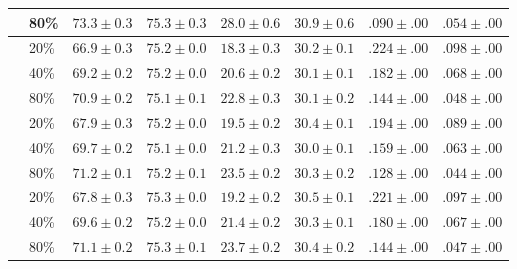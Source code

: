 \begin{table}[htpb]
\begin{longtable}{llrrrrrr}
                        & 80\% & $73.3\pm0.3$ & $75.3\pm0.3$ & $28.0\pm0.6$ & $30.9\pm0.6$ & $.090\pm.00$ & $.054\pm.00$ \\
\midrule
\multirow{3}{*}{\sla{}} & 20\% & $66.9\pm0.3$ & $75.2\pm0.0$ & $18.3\pm0.3$ & $30.2\pm0.1$ & $.224\pm.00$ & $.098\pm.00$ \\
                        & 40\% & $69.2\pm0.2$ & $75.2\pm0.0$ & $20.6\pm0.2$ & $30.1\pm0.1$ & $.182\pm.00$ & $.068\pm.00$ \\
                        & 80\% & $70.9\pm0.2$ & $75.1\pm0.1$ & $22.8\pm0.3$ & $30.1\pm0.2$ & $.144\pm.00$ & $.048\pm.00$ \\
\midrule
\multirow{3}{*}{\epi{}} & 20\% & $67.9\pm0.3$ & $75.2\pm0.0$ & $19.5\pm0.2$ & $30.4\pm0.1$ & $.194\pm.00$ & $.089\pm.00$ \\
                        & 40\% & $69.7\pm0.2$ & $75.1\pm0.0$ & $21.2\pm0.3$ & $30.0\pm0.1$ & $.159\pm.00$ & $.063\pm.00$ \\
                        & 80\% & $71.2\pm0.1$ & $75.2\pm0.1$ & $23.5\pm0.2$ & $30.3\pm0.2$ & $.128\pm.00$ & $.044\pm.00$ \\
\midrule
\multirow{3}{*}{\kiw{}} & 20\% & $67.8\pm0.3$ & $75.3\pm0.0$ & $19.2\pm0.2$ & $30.5\pm0.1$ & $.221\pm.00$ & $.097\pm.00$ \\
                        & 40\% & $69.6\pm0.2$ & $75.2\pm0.0$ & $21.4\pm0.2$ & $30.3\pm0.1$ & $.180\pm.00$ & $.067\pm.00$ \\
                        & 80\% & $71.1\pm0.2$ & $75.3\pm0.1$ & $23.7\pm0.2$ & $30.4\pm0.2$ & $.144\pm.00$ & $.047\pm.00$ \\
    \bottomrule
  \end{longtable}
\end{table}
